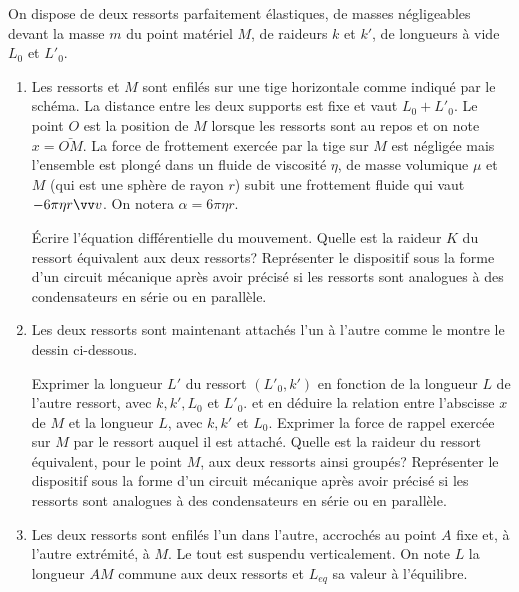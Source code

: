 \begin{exercice}
  On dispose de deux ressorts parfaitement élastiques, de masses négligeables
  devant la masse \(m\) du point matériel \(M\), de raideurs \(k\) et \(k'\), de
  longueurs à vide \(L_0\) et \(L'_0\).
  \begin{enumerate}
    \item Les ressorts et \(M\) sont enfilés sur une tige horizontale comme
      indiqué par le schéma. La distance entre les deux supports est fixe et
      vaut \(L_0+L'_0\). Le point \(O\) est la position de \(M\) lorsque les
      ressorts sont au repos et on note \(x = \bar{OM}\).
      La force de frottement exercée par la tige sur \(M\) est négligée mais
      l'ensemble est plongé dans un fluide de viscosité \(\eta\), de masse
      volumique \(\mu\) et \(M\) (qui est une sphère de rayon \(r\)) subit une
      frottement fluide qui vaut \(-6\pi\eta r \vvv\). On notera \(\alpha =
      6\pi\eta r\).

      Écrire l'équation différentielle du mouvement. Quelle est la raideur \(K\)
      du ressort équivalent aux deux ressorts? Représenter le dispositif sous la
      forme d'un circuit mécanique après avoir précisé si les ressorts sont
      analogues à des condensateurs en série ou en parallèle.
    \item Les deux ressorts sont maintenant attachés l'un à l'autre comme le
      montre le dessin ci-dessous.

      Exprimer la longueur \(L'\) du ressort \((L'_0, k')\) en fonction de la
      longueur \(L\) de l'autre ressort, avec \(k, k', L_0\) et \(L'_0\). et en
      déduire la relation entre l'abscisse \(x\) de \(M\) et la longueur \(L\),
      avec \(k, k'\) et \(L_0\). Exprimer la force de rappel exercée sur \(M\)
      par le ressort auquel il est attaché. Quelle est la raideur du ressort
      équivalent, pour le point \(M\), aux deux ressorts ainsi groupés?
      Représenter le dispositif sous la forme d'un circuit mécanique après avoir
      précisé si les ressorts sont analogues à des condensateurs en série ou en
      parallèle.
    \item Les deux ressorts sont enfilés l'un dans l'autre, accrochés au point
      \(A\) fixe et, à l'autre extrémité, à \(M\). Le tout est suspendu
      verticalement. On note \(L\) la longueur \(AM\) commune aux deux ressorts
      et \(L_{eq}\) sa valeur à l'équilibre.


\end{enumerate}
\end{exercice}
